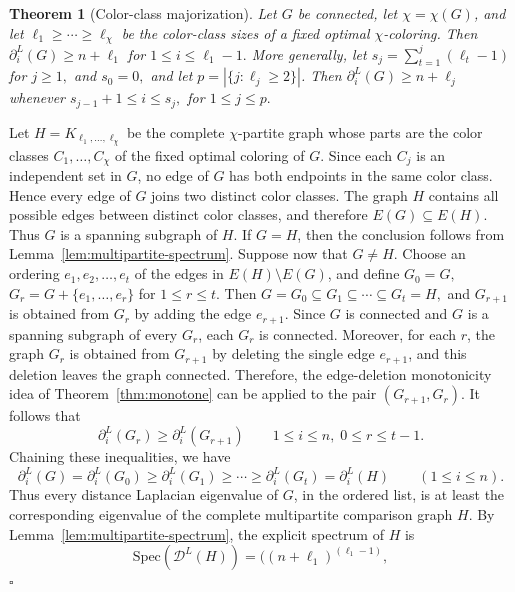 \documentclass[12pt]{article}
\newcommand{\DL}{\mathcal{D}^{L}}
\theoremstyle{plain}
\newtheorem{theorem}{Theorem}[section]
\theoremstyle{definition}
\renewenvironment{proof}{{\noindent\bfseries Proof. }}{\hfill$\square$\par}
\begin{document}
\begin{theorem}[Color-class majorization]\label{thm:color-majorization}
Let $G$ be connected, let $\chi=\chi(G)$, and let
$\ell_1\ge\cdots\ge\ell_\chi$ be the color-class sizes of a fixed optimal $\chi$-coloring. Then
 $\partial^{L}_i(G)\ge n+\ell_1$ for $1\le i\le \ell_1-1. $
More generally, let $s_j=\sum_{t=1}^{j}(\ell_t-1)$ for $j\ge1,$ and $s_0=0,$ and let $p=|\{j:\ell_j\ge2\}|$. Then
$\partial^{L}_i(G)\ge n+\ell_j$  whenever $s_{j-1}+1\le i\le s_j,$ for  $1\le j\le p.$ 
\end{theorem}

\begin{proof}
	Let $H=K_{\ell_1,\dots,\ell_\chi}$ be the complete $\chi$-partite graph whose parts are the color classes
	$C_1,\dots,C_\chi$ of the fixed optimal coloring of $G$. Since each $C_j$ is an independent set in $G$, no edge of $G$ has both endpoints in the same color class. Hence every edge of $G$ joins two distinct color classes. The graph $H$ contains all possible edges between distinct color classes, and therefore $E(G)\subseteq E(H).$ Thus $G$ is a spanning subgraph of $H$.
	 If $G=H$, then the conclusion follows from Lemma~\ref{lem:multipartite-spectrum}. Suppose now that $G\ne H$. Choose an ordering $e_1,e_2,\dots,e_t$ of the edges in $E(H)\setminus E(G)$, and define $G_0=G,$ $G_r=G+\{e_1,\dots,e_r\}$ for $1\le r\le t.$ Then $G=G_0\subseteq G_1\subseteq\cdots\subseteq G_t=H,$ and $G_{r+1}$ is obtained from $G_r$ by adding the edge $e_{r+1}$. Since $G$ is connected and $G$ is a spanning subgraph of every $G_r$, each $G_r$ is connected. Moreover, for each $r$, the graph $G_r$ is obtained from $G_{r+1}$ by deleting the single edge $e_{r+1}$, and this deletion leaves the graph connected. Therefore, the edge-deletion monotonicity idea of Theorem~\ref{thm:monotone} can be applied to the pair
	 $(G_{r+1},G_r).$ It follows that 
	\[
	\partial_i^L(G_r)\ge \partial_i^L(G_{r+1})
	\qquad
	1\le i\le n,\;0\le r\le t-1.
	\]
	Chaining these inequalities, we have
	\begin{equation}\label{eq:domination-G-H}
		\partial_i^L(G)=\partial_i^L(G_0)
		\ge \partial_i^L(G_1)
		\ge \cdots
		\ge \partial_i^L(G_t)
		=
		\partial_i^L(H)
		\qquad (1\le i\le n).
	\end{equation}
	Thus every distance Laplacian eigenvalue of $G$, in the ordered list, is at least the corresponding eigenvalue of the complete multipartite comparison graph $H$. By Lemma~\ref{lem:multipartite-spectrum}, the explicit spectrum of $H$ is
	\[
	\mathrm{Spec}(\DL(H))
	=
	\Big(
	(n+\ell_1)^{(\ell_1-1)},
\]
\end{proof}
\end{document}
